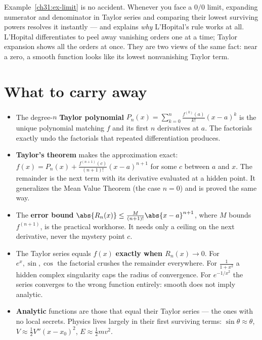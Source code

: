 \begin{connectionbox}
Example~\ref{ch31:ex-limit} is no accident. Whenever you face a $0/0$ limit, expanding
numerator and denominator in Taylor series and comparing their lowest surviving powers
resolves it instantly --- and explains \emph{why} L'Hopital's rule works at all.
L'Hopital differentiates to peel away vanishing orders one at a time; Taylor expansion
shows all the orders at once. They are two views of the same fact: near a zero, a
smooth function looks like its lowest nonvanishing Taylor term.
\end{connectionbox}

\section{What to carry away}

\begin{itemize}
\item The degree-$n$ \textbf{Taylor polynomial} $P_n(x) = \sum_{k=0}^n
\frac{f^{(k)}(a)}{k!}(x-a)^k$ is the unique polynomial matching $f$ and its first $n$
derivatives at $a$. The factorials exactly undo the factorials that repeated
differentiation produces.
\item \textbf{Taylor's theorem} makes the approximation exact:
$f(x) = P_n(x) + \frac{f^{(n+1)}(c)}{(n+1)!}(x-a)^{n+1}$ for some $c$ between $a$ and
$x$. The remainder is the next term with its derivative evaluated at a hidden point.
It generalizes the Mean Value Theorem (the case $n=0$) and is proved the same way.
\item The \textbf{error bound}
$\abs{R_n(x)} \le \frac{M}{(n+1)!}\abs{x-a}^{n+1}$, where $M$ bounds $f^{(n+1)}$,
is the practical workhorse. It needs only a ceiling on the next derivative, never the
mystery point $c$.
\item The Taylor series equals $f(x)$ \textbf{exactly when $R_n(x)\to 0$}. For
$e^x, \sin, \cos$ the factorial crushes the remainder everywhere. For $\frac{1}{1+x^2}$
a hidden complex singularity caps the radius of convergence. For $e^{-1/x^2}$ the
series converges to the wrong function entirely: smooth does not imply analytic.
\item \textbf{Analytic} functions are those that equal their Taylor series --- the
ones with no local secrets. Physics lives largely in their first surviving terms:
$\sin\theta\approx\theta$, $V\approx \tfrac12 V'' (x-x_0)^2$, $E\approx\tfrac12 mv^2$.
\end{itemize}

